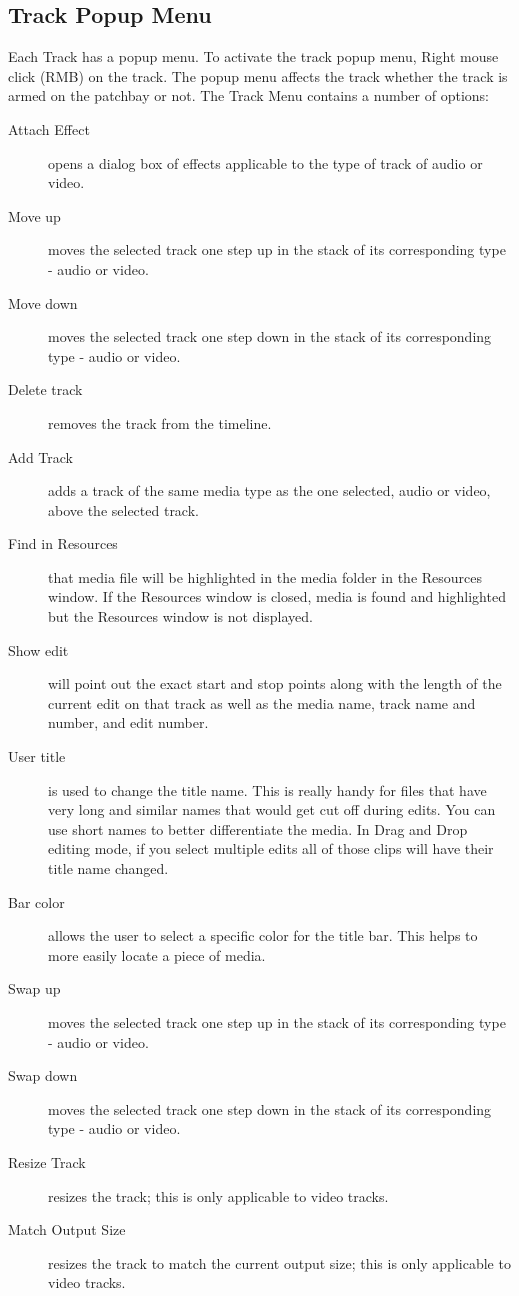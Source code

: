 \subsection{Track Popup Menu}%
\label{sub:track_popup_menu}

Each Track has a popup menu. 
To activate the track popup menu, Right mouse click (RMB) on the track. 
The popup menu affects the track whether the track is armed on the patchbay or not. 
The Track Menu contains a number of options:

\begin{description}
    \item[Attach Effect] opens a dialog box of effects applicable to the type of track of audio or video.
    \item[Move up] moves the selected track one step up in the stack of its corresponding type - audio or video.
    \item[Move down]  moves the selected track one step down in the stack of its corresponding type - audio or video.
    \item[Delete track]  removes the track from the timeline.
    \item[Add Track]  adds a track of the same media type as the one selected, audio or video, above the selected track.
    \item[Find in Resources]  that media file will be highlighted in the media folder in the Resources window. If the 
	Resources window is closed, media is found and highlighted but the Resources window is not displayed.
    \item[Show edit]  will point out the exact start and stop points along with the length of the current edit on
        that track as well as the media name, track name and number, and edit number.
    \item[User title]  is used to change the title name.  This is really handy for files that have very long and
        similar names that would get cut off during edits.  You can use short names to better differentiate the
        media. In Drag and Drop editing mode, if you select multiple edits all of those clips will have
their title name changed.
    \item[Bar color]  allows the user to select a specific color for the title bar.  This helps to more easily locate a piece of media.
    \item[Swap up] moves the selected track one step up in the stack of its corresponding type - audio or video.
    \item[Swap down]  moves the selected track one step down in the stack of its corresponding type - audio or video.
    \item[Resize Track]  resizes the track; this is only applicable to video tracks.
    \item[Match Output Size]  resizes the track to match the current output size; this is only applicable to video tracks.
\end{description}


